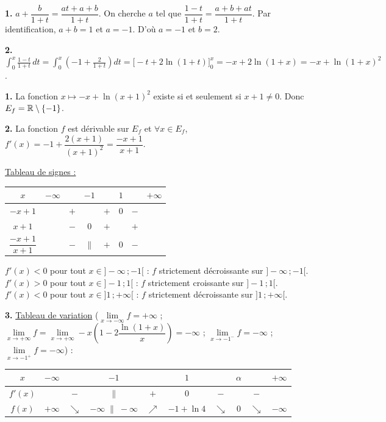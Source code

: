 \documentclass[11pt]{article}
\begin{document}
\textbf{1.} $a + \dfrac{b}{1 + t} = \dfrac{at + a + b}{1 + t}$. On cherche $a$ tel que $\dfrac{1 - t}{1 + t} = \dfrac{a + b + at}{1 + t}$. Par identification, $a + b = 1$ et $a = -1$. D'où $a = -1$ et $b = 2$.

\textbf{2.} $\displaystyle\int_0^x \frac{1 - t}{1 + t}\,dt = \int_0^x \left(-1 + \frac{2}{1 + t}\right)dt = \Big[-t + 2\ln(1 + t)\Big]_0^x = -x + 2\ln(1 + x) = -x + \ln(1 + x)^2$.

\textbf{1.} La fonction $x \mapsto -x + \ln(x + 1)^2$ existe si et seulement si $x + 1 \ne 0$. Donc $E_f = \mathbb{R} \setminus \{-1\}$.

\textbf{2.} La fonction $f$ est dérivable sur $E_f$ et $\forall x \in E_f$, $f'(x) = -1 + \dfrac{2(x + 1)}{(x + 1)^2} = \dfrac{-x + 1}{x + 1}$.

\underline{Tableau de signes :}
\begin{center}\renewcommand{\arraystretch}{1.4}
\begin{tabular}{|c|ccccccc|}
\hline
$x$ & $-\infty$ & & $-1$ & & $1$ & & $+\infty$ \\
\hline
$-x + 1$ & & $+$ & & $+$ & $0$ & $-$ & \\
\hline
$x + 1$ & & $-$ & $0$ & $+$ & & $+$ & \\
\hline
$\dfrac{-x + 1}{x + 1}$ & & $-$ & $\|$ & $+$ & $0$ & $-$ & \\
\hline
\end{tabular}
\end{center}
$f'(x) < 0$ pour tout $x \in ]-\infty\,;-1[$ : $f$ strictement décroissante sur $]-\infty\,;-1[$. $f'(x) > 0$ pour tout $x \in ]-1\,;1[$ : $f$ strictement croissante sur $]-1\,;1[$. $f'(x) < 0$ pour tout $x \in ]1\,;+\infty[$ : $f$ strictement décroissante sur $]1\,;+\infty[$.

\textbf{3.} \underline{Tableau de variation} ($\lim\limits_{x\to-\infty} f = +\infty$ ; $\lim\limits_{x\to+\infty} f = \lim\limits_{x\to+\infty} -x\left(1 - 2\dfrac{\ln(1 + x)}{x}\right) = -\infty$ ; $\lim\limits_{x\to-1^-} f = -\infty$ ; $\lim\limits_{x\to-1^+} f = -\infty$) :
\begin{center}\renewcommand{\arraystretch}{1.4}
\begin{tabular}{|c|ccccccccc|}
\hline
$x$ & $-\infty$ & & $-1$ & & $1$ & & $\alpha$ & & $+\infty$ \\
\hline
$f'(x)$ & & $-$ & $\|$ & $+$ & $0$ & $-$ & & $-$ & \\
\hline
$f(x)$ & $+\infty$ & $\searrow$ & $-\infty \;\|\; -\infty$ & $\nearrow$ & $-1 + \ln 4$ & $\searrow$ & $0$ & $\searrow$ & $-\infty$ \\
\hline
\end{tabular}
\end{center}
\end{document}
